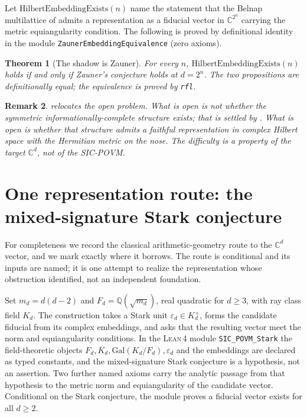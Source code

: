 \documentclass[12pt,a4paper]{article}
\newtheorem{theorem}{Theorem}[section]
\newtheorem{remark}[theorem]{Remark}
\newcommand{\Lean}{\textsc{Lean\,4}}
\begin{document}
Let $\mathrm{HilbertEmbeddingExists}(n)$ name the statement that the Belnap
multilattice of  admits a representation as a fiducial vector in
$\mathbb{C}^{2^n}$ carrying the metric equiangularity condition. The following
is proved by definitional identity in the module
\texttt{ZaunerEmbeddingEquivalence} (zero axioms).

\begin{theorem}[The shadow is Zauner]
\label{thm:shadow-is-zauner}
For every $n$, $\mathrm{HilbertEmbeddingExists}(n)$ holds if and only if
Zauner's conjecture holds at $d = 2^n$. The two propositions are definitionally
equal; the equivalence is proved by \texttt{rfl}.
\end{theorem}

\begin{remark}
 relocates the open problem. What is open is not
whether the symmetric informationally-complete structure exists; that is
settled by . What is open is whether that structure
admits a faithful representation in complex Hilbert space with the Hermitian
metric on the nose. The difficulty is a property of the target
$\mathbb{C}^d$, not of the SIC-POVM.
\end{remark}

\section{One representation route: the mixed-signature Stark conjecture}

For completeness we record the classical arithmetic-geometry route to the
$\mathbb{C}^d$ vector, and we mark exactly where it borrows. The route is
conditional and its inputs are named; it is one attempt to realize the
representation whose obstruction  identified, not an
independent foundation.

Set $m_d = d(d-2)$ and $F_d = \mathbb{Q}(\sqrt{m_d})$, real quadratic for
$d \geq 3$, with ray class field $K_d$. The construction takes a Stark unit
$\varepsilon_d \in K_d^\times$, forms the candidate fiducial from its complex
embeddings, and asks that the resulting vector meet the norm and
equiangularity conditions. In the \Lean{} module \texttt{SIC\_POVM\_Stark} the
field-theoretic objects $F_d, K_d, \mathrm{Gal}(K_d/F_d), \varepsilon_d$ and
the embeddings are declared as typed constants, and the mixed-signature Stark
conjecture is a hypothesis, not an assertion. Two further named axioms carry
the analytic passage from that hypothesis to the metric norm and
equiangularity of the candidate vector. Conditional on the Stark conjecture,
the module proves a fiducial vector exists for all $d \geq 2$.
\end{document}
